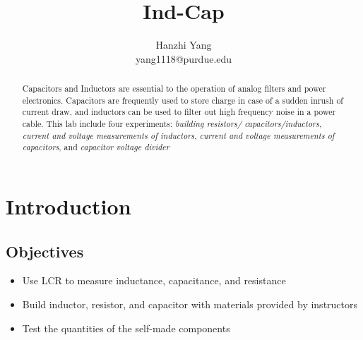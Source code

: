 \documentclass[journal, letterpaper]{IEEEtran}
\begin{document}
	\title{\textbf{Ind-Cap}}
	\author{Hanzhi Yang \\ yang1118@purdue.edu}
	\maketitle

\begin{abstract}
	Capacitors and Inductors are essential to the operation of analog filters and power electronics. Capacitors are frequently used to store charge in case of a sudden inrush of current draw, and inductors can be used to filter out high frequency noise in a power cable. This lab include four experiments: \textit{building resistors/ capacitors/inductors}, \textit{current and voltage measurements of inductors}, \textit{current and voltage measurements of capacitors}, and \textit{capacitor voltage divider}
\end{abstract}

\section{\textbf{Introduction}}
    \subsection{Objectives}
    	\begin{itemize}
        	\item Use LCR to measure inductance, capacitance, and resistance
            \item Build inductor, resistor, and capacitor with materials provided by instructors
            \item Test the quantities of the self-made components
        \end{itemize}
\end{document}
